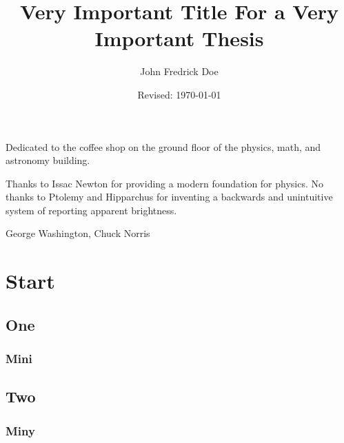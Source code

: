 \documentclass{utthesis}
\begin{document}
\author{John Fredrick Doe} 
\title{Very Important Title For a Very Important Thesis} 
\date{Revised: \today}


\frontmatter

\UTcopyrightlegend %

\begin{UTcommittee}
\end{UTcommittee}


\begin{UTdedication}
Dedicated to the coffee shop on the ground floor of the physics, math, and astronomy building.
\end{UTdedication}

\begin{UTacknowledgements}
Thanks to Issac Newton for providing a modern foundation for physics. No thanks to Ptolemy and Hipparchus for inventing a backwards and unintuitive system of reporting apparent brightness.
\end{UTacknowledgements}

\begin{UTabstract}[S]{George Washington, Chuck Norris}
\lipsum[1]
\end{UTabstract}


\tableofcontents

\listoftables

\listoffigures

\mainmatter

\chapter{Start}
\lipsum[3]
\section{One}
\subsection{Mini}
\section{Two}
\subsection{Miny}
\end{document}
